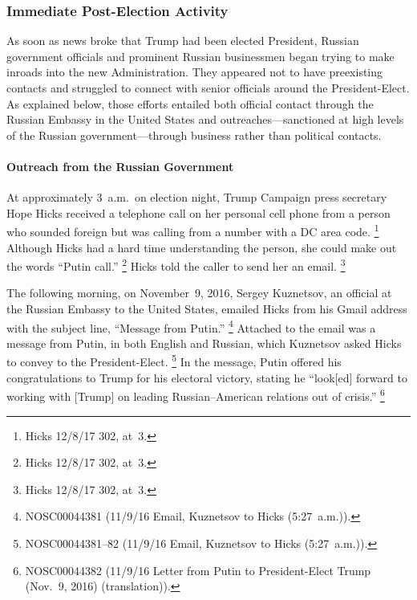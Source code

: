 \subsubsection{Immediate Post-Election Activity}

As soon as news broke that Trump had been elected President, Russian government officials and prominent Russian businessmen began trying to make inroads into the new Administration.
They appeared not to have preexisting contacts and struggled to connect with senior officials around the President-Elect.
As explained below, those efforts entailed both official contact through the Russian Embassy in the United States and outreaches---sanctioned at high levels of the Russian government---through business rather than political contacts.

\paragraph{Outreach from the Russian Government}

At approximately 3~a.m.\ on election night, Trump Campaign press secretary Hope Hicks received a telephone call on her personal cell phone from a person who sounded foreign but was calling from a number with a DC area code.%
\footnote{Hicks 12/8/17 302, at~3.}
Although Hicks had a hard time understanding the person, she could make out the words ``Putin call.''%
\footnote{Hicks 12/8/17 302, at~3.}
Hicks told the caller to send her an email.%
\footnote{Hicks 12/8/17 302, at~3.}

The following morning, on November~9, 2016, Sergey Kuznetsov, an official at the Russian Embassy to the United States, emailed Hicks from his Gmail address with the subject line, ``Message from Putin.''%
\footnote{NOSC00044381 (11/9/16 Email, Kuznetsov to Hicks (5:27~a.m.)).}
Attached to the email was a message from Putin, in both English and Russian, which Kuznetsov asked Hicks to convey to the President-Elect.%
\footnote{NOSC00044381--82 (11/9/16 Email, Kuznetsov to Hicks (5:27~a.m.)).}
In the message, Putin offered his congratulations to Trump for his electoral victory, stating he ``look[ed] forward to working with [Trump] on leading Russian--American relations out of crisis.''%
\footnote{NOSC00044382 (11/9/16 Letter from Putin to President-Elect Trump (Nov.~9, 2016) (translation)).}


